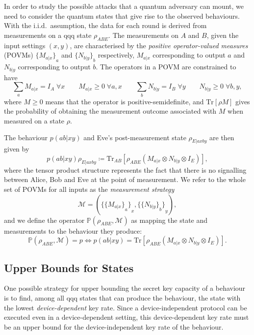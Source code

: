 \documentclass[10pt, a4paper]{article}
\numberwithin{equation}{section} %
\theoremstyle{definition}
\theoremstyle{plain}
\newcommand{\?}{\mathrel{?}} %
\newcommand{\Tr}{\mathrm{Tr}} %
\newcommand{\sM}{\mathcal{M}}
\newcommand{\cP}{\mathbb{P}}
\begin{document}
    In order to study the possible attacks that a quantum adversary can mount, we need to consider the quantum states that give rise to the observed behaviours. With the i.i.d.\ assumption, the data for each round is derived from measurements on a qqq state \(\rho_{A B E}\). The measurements on \(A\) and \(B\), given the input settings \((x,y)\), are characterised by the \emph{positive operator-valued measures} (POVMs)  \({\{M_{a|x}\}}_{a}\) and \({\{N_{b|y}\}}_{b}\) respectively, \(M_{a|x}\) corresponding to output \(a\) and \(N_{b|y}\) corresponding to output \(b\). The operators in a POVM are constrained to have
    \[ \sum_{a} M_{a|x} = I_{A}\;\forall x \qquad M_{a|x} \geq 0\;\forall a, x \qquad \sum_{b} N_{b|y} = I_{B}\;\forall y \qquad N_{b|y} \geq 0\;\forall b, y, \]
    where \(M \geq 0\) means that the operator is positive-semidefinite, and \(\Tr\left[\rho M\right]\) gives the probability of obtaining the measurement outcome associated with \(M\) when measured on a state \(\rho\). 

    The behaviour \(p(ab|xy)\) and Eve's post-measurement state \(\rho_{E|axby}\) are then given by
      \begin{equation}\label{eqn:probmeas}
        p(ab|xy) \rho_{E|axby} \coloneqq \Tr_{A B}\left[\rho_{A B E} \left(M_{a|x} \otimes N_{b|y} \otimes I_{E}\right) \right],
      \end{equation}
    where the tensor product structure represents the fact that there is no signalling between Alice, Bob and Eve at the point of measurement. We refer to the whole set of POVMs for all inputs as the \emph{measurement strategy}
    \[ \sM = \left({\{ {\{ M_{a|x}\}}_a \}}_x, {\{ {\{N_{b|y}\}}_b \}}_y \right), \]
    and we define the operator \(\cP(\rho_{ABE}, \sM)\) as mapping the state and measurements to the behaviour they produce:
    \begin{equation}
      \cP(\rho_{ABE}, \sM) = p \Leftrightarrow p(ab|xy) = \Tr\left[\rho_{A B E} \left(M_{a|x} \otimes N_{b|y} \otimes I_{E}\right) \right].
    \end{equation}

      \subsection{Upper Bounds for States}

      One possible strategy for upper bounding the secret key capacity of a behaviour is to find, among all qqq states that can produce the behaviour, the state with the lowest \emph{device-dependent} key rate. Since a device-independent protocol can be executed even in a device-dependent setting, this device-dependent key rate must be an upper bound for the device-independent key rate of the behaviour.
\end{document}
